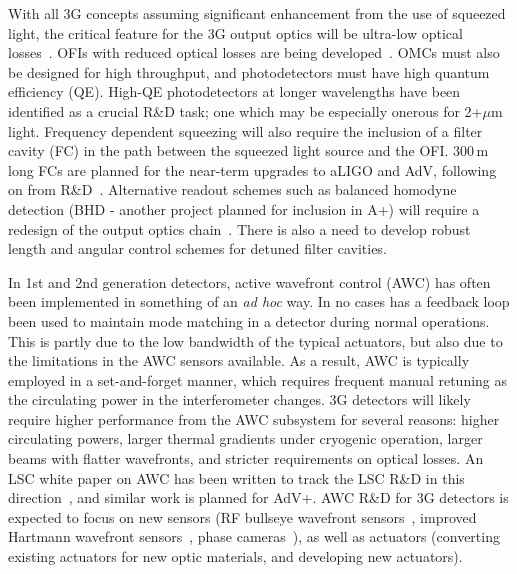With all 3G concepts assuming significant enhancement from the use of squeezed light, the critical feature for the 3G output optics will be ultra-low optical losses~\cite{squeeze_lossbudget}. OFIs with reduced optical losses are being developed~\cite{EGOLLFI,UFLLFI}.
OMCs must also be designed for high throughput, and photodetectors must have high quantum efficiency (QE). High-QE photodetectors at longer wavelengths have been identified as a crucial R\&D task; one which may be especially onerous for 2+$\mu$m light. 
Frequency dependent squeezing will also require the inclusion of a filter cavity (FC) in the path between the squeezed light source and the OFI. 300\,m long FCs are planned for the near-term upgrades to aLIGO and AdV, following on from R\&D~\cite{MITFC,TAMA_FDS2016}.
Alternative readout schemes such as balanced homodyne detection (BHD - another project planned for inclusion in A+) will require a redesign of the output optics chain~\cite{BHD}. There is also a need to develop robust length and angular control schemes for detuned filter cavities.

In 1st and 2nd generation detectors, active wavefront control (AWC) has often been implemented in something of an \emph{ad hoc} way. In no cases has a feedback loop been used to maintain mode matching in a detector during normal operations. This is partly due to the low bandwidth of the typical actuators, but also due to the limitations in the AWC sensors available. As a result, AWC is typically employed in a set-and-forget manner, which requires frequent manual retuning as the circulating power in the interferometer changes. 3G detectors will likely require higher performance from the AWC subsystem for several reasons: higher circulating powers, larger thermal gradients under cryogenic operation, larger beams with flatter wavefronts, and stricter requirements on optical losses. An LSC white paper on AWC has been written to track the LSC R\&D in this direction~\cite{aLIGO_AWC}, and similar work is planned for AdV+. AWC R\&D for 3G detectors is expected to focus on new sensors (RF bullseye wavefront sensors~\cite{bullseye}, improved Hartmann wavefront sensors~\cite{HWS}, phase cameras~\cite{phasecam}), as well as actuators (converting existing actuators for new optic materials, and developing new actuators). 

